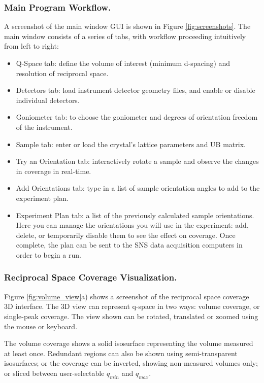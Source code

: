 \documentclass[draft]{iucr}              %
\begin{document}
\subsubsection{Main Program Workflow.}
A screenshot of the main window GUI is shown in Figure \ref{fig:screenshots}.
The main window consists of a series of tabs, with workflow proceeding
intuitively from left to right:

\begin{itemize}
  	\item Q-Space tab: define the volume of interest (minimum d-spacing) and
resolution of reciprocal space. 
 	\item Detectors tab: load instrument detector geometry
files, and enable or disable individual detectors. 
	\item Goniometer tab: to choose the
goniometer and degrees of orientation freedom of the instrument.
  	\item Sample tab: enter or load the crystal's lattice parameters and UB
  matrix.
  	\item Try an Orientation tab: interactively rotate a sample and observe the
  changes in coverage in real-time.
  	\item Add Orientations tab: type in a list of sample orientation angles to
  add to the experiment plan.
 
  	\item Experiment Plan tab: a list of the previously calculated sample
orientations. Here you can manage the orientations you will use in the experiment: add,
delete, or temporarily disable them to see the effect on coverage. Once
complete, the plan can be sent to the SNS data acquisition computers in order to
begin a run.
    
\end{itemize} 



\subsubsection{Reciprocal Space Coverage Visualization.}
Figure \ref{fig:volume_view}a) shows a screenshot of the reciprocal space
coverage 3D interface. The 3D view can represent q-space in two ways: volume coverage, or single-peak
coverage. The view shown can be rotated, translated or zoomed using the mouse or
keyboard.

The volume coverage shows a solid isosurface representing the volume measured at
least once. Redundant regions can also be shown using semi-transparent
isosurfaces; or the coverage can be inverted, showing non-measured volumes only;
or sliced between user-selectable $q_{min}$ and $q_{max}$.        
\end{document}
